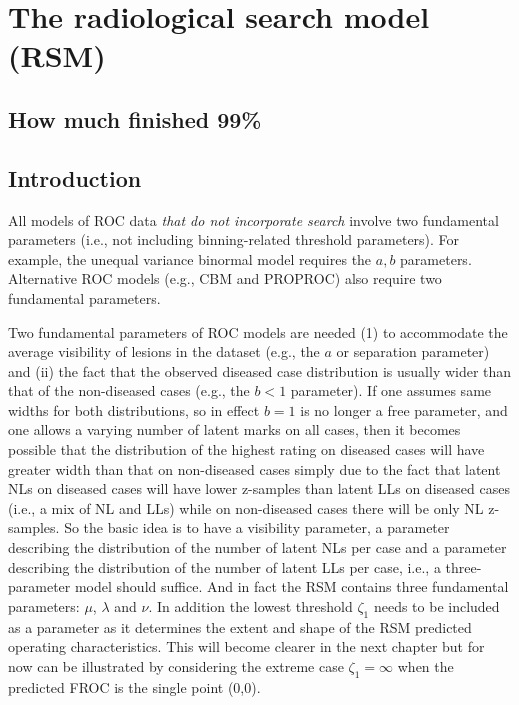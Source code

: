 \documentclass[
]{book}
\begin{document}
\hypertarget{rsm}{%
\chapter{The radiological search model (RSM)}\label{rsm}}

\hypertarget{rsm-how-much-finished}{%
\section{How much finished 99\%}\label{rsm-how-much-finished}}

\hypertarget{rsm-intro}{%
\section{Introduction}\label{rsm-intro}}

All models of ROC data \emph{that do not incorporate search} involve two fundamental parameters (i.e., not including binning-related threshold parameters). For example, the unequal variance binormal model requires the \(a,b\) parameters. Alternative ROC models (e.g., CBM and PROPROC) also require two fundamental parameters.

Two fundamental parameters of ROC models are needed (1) to accommodate the average visibility of lesions in the dataset (e.g., the \(a\) or separation parameter) and (ii) the fact that the observed diseased case distribution is usually wider than that of the non-diseased cases (e.g., the \(b <1\) parameter). If one assumes same widths for both distributions, so in effect \(b=1\) is no longer a free parameter, and one allows a varying number of latent marks on all cases, then it becomes possible that the distribution of the highest rating on diseased cases will have greater width than that on non-diseased cases simply due to the fact that latent NLs on diseased cases will have lower z-samples than latent LLs on diseased cases (i.e., a mix of NL and LLs) while on non-diseased cases there will be only NL z-samples. So the basic idea is to have a visibility parameter, a parameter describing the distribution of the number of latent NLs per case and a parameter describing the distribution of the number of latent LLs per case, i.e., a three-parameter model should suffice. And in fact the RSM contains three fundamental parameters: \(\mu\), \(\lambda\) and \(\nu\). In addition the lowest threshold \(\zeta_1\) needs to be included as a parameter as it determines the extent and shape of the RSM predicted operating characteristics. This will become clearer in the next chapter but for now can be illustrated by considering the extreme case \(\zeta_1 = \infty\) when the predicted FROC is the single point (0,0).
\end{document}
